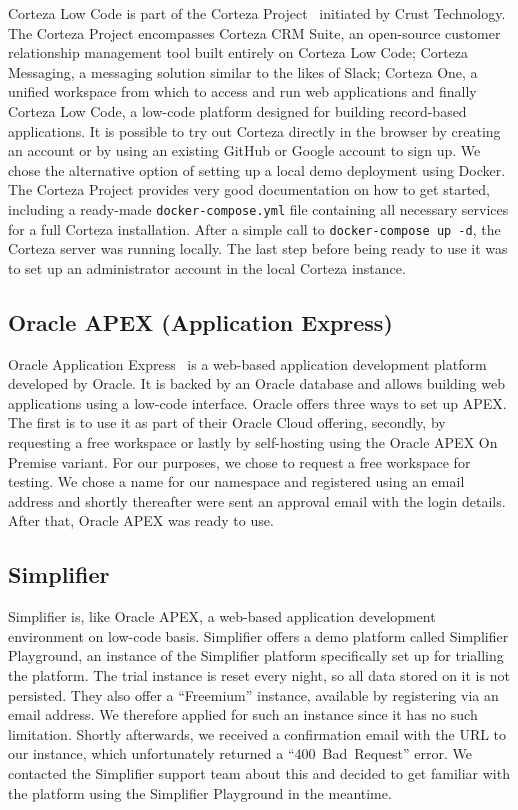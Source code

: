 \documentclass[runningheads]{llncs}
\begin{document}
Corteza Low Code is part of the Corteza Project~\cite{corteza} initiated by Crust Technology. The Corteza Project encompasses Corteza CRM Suite, an open-source customer relationship management tool built entirely on Corteza Low Code; Corteza Messaging, a messaging solution similar to the likes of Slack; Corteza One, a unified workspace from which to access and run web applications and finally Corteza Low Code, a low-code platform designed for building record-based applications. It is possible to try out Corteza directly in the browser by creating an account or by using an existing GitHub or Google account to sign up. We chose the alternative option of setting up a local demo deployment using Docker. The Corteza Project provides very good documentation on how to get started, including a ready-made \texttt{docker-compose.yml} file containing all necessary services for a full Corteza installation. After a simple call to \texttt{docker-compose up -d}, the Corteza server was running locally. The last step before being ready to use it was to set up an administrator account in the local Corteza instance.

\subsection{Oracle APEX (Application Express)}

Oracle Application Express~\cite{oracle_apex} is a web-based application development platform developed by Oracle. It is backed by an Oracle database and allows building web applications using a low-code interface. Oracle offers three ways to set up APEX. The first is to use it as part of their Oracle Cloud offering, secondly, by requesting a free workspace or lastly by self-hosting using the Oracle APEX On Premise variant. For our purposes, we chose to request a free workspace for testing. We chose a name for our namespace and registered using an email address and shortly thereafter were sent an approval email with the login details. After that, Oracle APEX was ready to use.

\subsection{Simplifier}

Simplifier is, like Oracle APEX, a web-based application development environment on low-code basis. Simplifier offers a demo platform called Simplifier Playground, an instance of the Simplifier platform specifically set up for trialling the platform. The trial instance is reset every night, so all data stored on it is not persisted. They also offer a “Freemium” instance, available by registering via an email address. We therefore applied for such an instance since it has no such limitation. Shortly afterwards, we received a confirmation email with the URL to our instance, which unfortunately returned a “400~Bad~Request” error. We contacted the Simplifier support team about this and decided to get familiar with the platform using the Simplifier Playground in the meantime.
\end{document}
